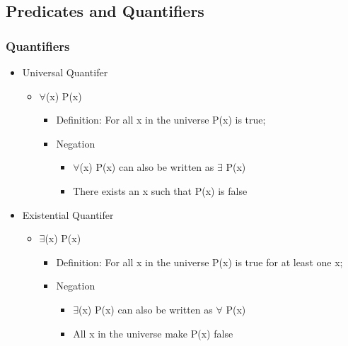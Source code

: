 \documentclass[11pt]{article}
\begin{document}
\subsection{Predicates and Quantifiers}
\label{sec-1-4}
\subsubsection{Quantifiers}
\label{sec-1-4-1}
\begin{itemize}

\item Universal Quantifer
\label{sec-1-4-1-1}%
\begin{itemize}

\item $\forall$(x) P(x)
\label{sec-1-4-1-1-1}%
\begin{itemize}

\item Definition: For all x in the universe P(x) is true;
\label{sec-1-4-1-1-1-1}%

\item Negation
\label{sec-1-4-1-1-1-2}%
\begin{itemize}

\item \textlnot{}$\forall$(x) P(x) can also be written as $\exists$\textlnot{} P(x)
\label{sec-1-4-1-1-1-2-1}%

\item There exists an x such that P(x) is false
\label{sec-1-4-1-1-1-2-2}%
\end{itemize} %
\end{itemize} %
\end{itemize} %

\item Existential Quantifer
\label{sec-1-4-1-2}%
\begin{itemize}

\item $\exists$(x) P(x)
\label{sec-1-4-1-2-1}%
\begin{itemize}

\item Definition: For all x in the universe P(x) is true for at least one x;
\label{sec-1-4-1-2-1-1}%

\item Negation
\label{sec-1-4-1-2-1-2}%
\begin{itemize}

\item \textlnot{}$\exists$(x) P(x) can also be written as $\forall$\textlnot{} P(x)
\label{sec-1-4-1-2-1-2-1}%

\item All x in the universe make P(x) false
\label{sec-1-4-1-2-1-2-2}%
\end{itemize} %
\end{itemize} %
\end{itemize} %
\end{itemize} %
\end{document}

